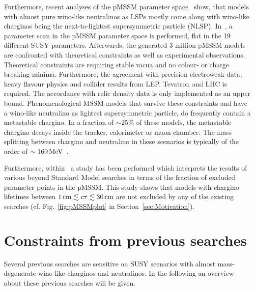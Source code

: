 Furthermore, recent analyses of the pMSSM parameter space~\cite{bib:pMSSMScan_2013,bib:pMSSMScan_2012} show, that models with almost pure wino-like neutralinos as LSPs mostly come along with wino-like charginos being the next-to-lightest supersymmetric particle (NLSP).
In~\cite{bib:pMSSMScan_2013}, a parameter scan in the pMSSM parameter space is performed, flat in the 19 different SUSY parameters.
Afterwards, the generated 3 million pMSSM models are confronted with theoretical constraints as well as experimental observations.
Theoretical constraints are \eg requiring stable vacua and no colour- or charge breaking minima.
Furthermore, the agreement with precision electroweak data, heavy flavour physics and collider results from LEP, Tevatron and LHC is required.
The accordance with relic density data is only implemented as an upper bound.
Phenomenological MSSM models that survive these constraints and have a wino-like neutralino as lightest supersymmetric particle, do frequently contain  a metastable chargino.
In a fraction of $\sim 25\%$ of these models, the metastable chargino decays inside the tracker, calorimeter or muon chamber.
The mass splitting between chargino and neutralino in these scenarios is typically of the order of $\sim160\,\text{Me}\kern-0.06667em\text{V}$~\cite{bib:pMSSMScan_2013}.

Furthermore, within~\cite{bib:CMS:DT_8TeV} a study has been performed which interprets the results of various beyond Standard Model searches in terms of the fraction of excluded parameter points in the pMSSM.
This study shows that models with chargino lifetimes between $1\,\text{cm} \lesssim c\tau \lesssim 30\,\text{cm}$ are not excluded by any of the existing searches (cf. Fig.~\ref{fig:pMSSMplot} in Section~\ref{sec:Motivation}).



\section{Constraints from previous searches}

Several previous searches are sensitive on SUSY scenarios with almost mass-degenerate wino-like charginos and neutralinos.
In the following an overview about these previous searches will be given.

